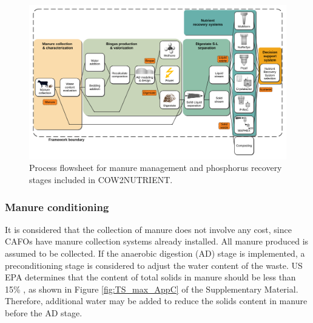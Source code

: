 \begin{refsection}[referencesCh4]
\begin{figure}[h]
	\centering
	\includegraphics[width=\linewidth, trim=1cm 1cm 1cm 1cm, clip]{gfx/Chapter4/Process_Flowsheet2.pdf} 
	\caption{Process flowsheet for manure management and phosphorus recovery stages included in COW2NUTRIENT.}
	\label{fig:flowsheet}
\end{figure}

\subsubsection{Manure conditioning}
It is considered that the collection of manure does not involve any cost, since CAFOs have manure collection systems already installed. All manure produced is assumed to be collected. If the anaerobic digestion (AD) stage is implemented, a preconditioning stage is considered to adjust the water content of the waste. US EPA determines that the content of total solids in manure should be less than 15\% \citep{AgSTARHandbook}, as shown in Figure \ref{fig:TS_max_AppC} of the Supplementary Material. Therefore, additional water may be added to reduce the solids content in manure before the AD stage.


\end{refsection}
